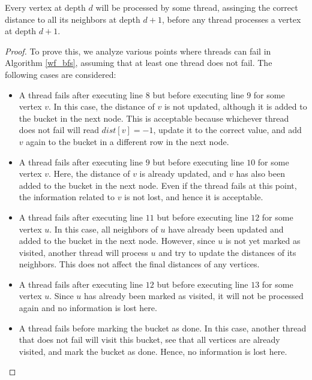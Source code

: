 \begin{lemma}
\label{lem:2}
Every vertex at depth $d$ will be processed by some thread, assinging the correct distance to all its neighbors at depth $d+1$, before any thread processes a vertex at depth $d+1$.
\end{lemma}
\begin{proof}
To prove this, we analyze various points where threads can fail in Algorithm \ref{wf_bfs}, assuming that at least one thread does not fail. The following cases are considered:

\begin{itemize}
    \item A thread fails after executing line $8$ but before executing line $9$ for some vertex $v$. In this case, the distance of $v$ is not updated, although it is added to the bucket in the next node. This is acceptable because whichever thread does not fail will read $dist[v] = -1$, update it to the correct value, and add $v$ again to the bucket in a different row in the next node.
    
    \item A thread fails after executing line $9$ but before executing line $10$ for some vertex $v$. Here, the distance of $v$ is already updated, and $v$ has also been added to the bucket in the next node. Even if the thread fails at this point, the information related to $v$ is not lost, and hence it is acceptable.
    
    \item A thread fails after executing line $11$ but before executing line $12$ for some vertex $u$. In this case, all neighbors of $u$ have already been updated and added to the bucket in the next node. However, since $u$ is not yet marked as visited, another thread will process $u$ and try to update the distances of its neighbors. This does not affect the final distances of any vertices.
    
    \item A thread fails after executing line $12$ but before executing line $13$ for some vertex $u$. Since $u$ has already been marked as visited, it will not be processed again and no information is lost here.
    
    \item A thread fails before marking the bucket as done. In this case, another thread that does not fail will visit this bucket, see that all vertices are already visited, and mark the bucket as done. Hence, no information is lost here.
    

\end{itemize}
\end{proof}
